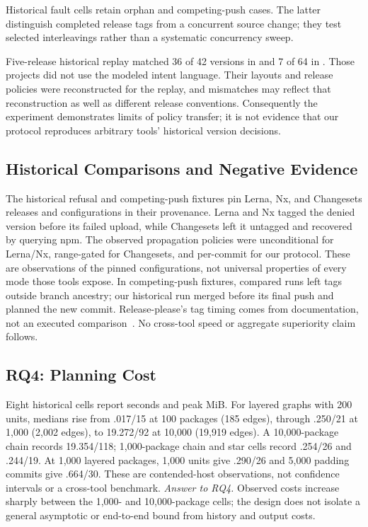 Historical fault cells retain orphan and competing-push cases. The latter
distinguish completed release tags from a concurrent source change; they test
selected interleavings rather than a systematic concurrency sweep.

Five-release historical replay matched 36 of 42 versions in
 and 7 of 64 in . Those
projects did not use the modeled intent language. Their layouts and release
policies were reconstructed for the replay, and mismatches may reflect that
reconstruction as well as different release conventions. Consequently the
experiment demonstrates limits of policy transfer; it is not evidence that
our protocol reproduces arbitrary tools' historical version decisions.

\subsection{Historical Comparisons and Negative Evidence}
\label{sec:compare}
The historical refusal and competing-push fixtures pin Lerna, Nx, and
Changesets releases and configurations in their provenance. Lerna and Nx tagged the
denied version before its failed upload, while Changesets left it untagged
and recovered by querying npm. The observed propagation policies were
unconditional for Lerna/Nx, range-gated for Changesets, and per-commit for our
protocol. These are observations of the pinned configurations, not universal
properties of every mode those tools expose.
In competing-push fixtures, compared runs left tags outside branch ancestry;
our historical run merged before its final push and planned the new commit.
Release-please's tag timing comes from documentation, not an executed
comparison~\cite{releaseplease}. No cross-tool speed or aggregate superiority
claim follows.



\subsection{RQ4: Planning Cost}
Eight historical cells report seconds and peak MiB. For layered graphs with
200 units, medians rise from .017/15 at 100 packages (185 edges), through
.250/21 at 1,000 (2,002 edges), to 19.272/92 at 10,000 (19,919 edges). A
10,000-package chain records 19.354/118; 1,000-package chain and star cells
record .254/26 and .244/19. At 1,000 layered packages, 1,000 units give
.290/26 and 5,000 padding commits give .664/30. These are contended-host
observations, not confidence intervals or a cross-tool benchmark.
\emph{Answer to RQ4.} Observed costs increase sharply between the 1,000- and
10,000-package cells; the design does not isolate a general asymptotic or
end-to-end bound from history and output costs.
